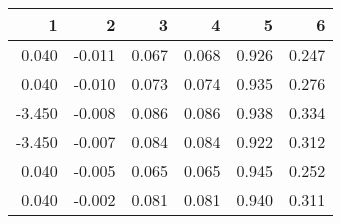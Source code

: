 \begin{table}[ht]
\centering
\begin{tabular}{rrrrrr}
  \hline
1 & 2 & 3 & 4 & 5 & 6 \\ 
  \hline
0.040 & -0.011 & 0.067 & 0.068 & 0.926 & 0.247 \\ 
  0.040 & -0.010 & 0.073 & 0.074 & 0.935 & 0.276 \\ 
  -3.450 & -0.008 & 0.086 & 0.086 & 0.938 & 0.334 \\ 
  -3.450 & -0.007 & 0.084 & 0.084 & 0.922 & 0.312 \\ 
  0.040 & -0.005 & 0.065 & 0.065 & 0.945 & 0.252 \\ 
  0.040 & -0.002 & 0.081 & 0.081 & 0.940 & 0.311 \\ 
   \hline
\end{tabular}
\end{table}

